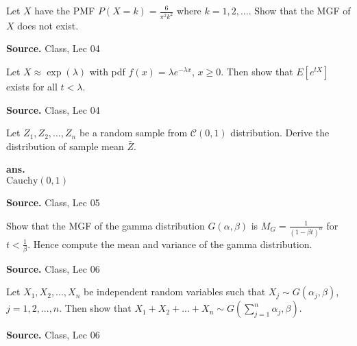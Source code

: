 \documentclass[12pt,twoside]{report}
\newenvironment*{ans}{\textbf{ans.}\space\em\\}{\par}
\newenvironment*{source}{\hfill\scriptsize\textbf{Source.}\space}{\par}
\begin{document}
\begin{samepage}
\begin{ex}
Let $X$ have the PMF $P(X = k) = \frac{6}{\pi ^2 k^2}$ where $k = 1,2, ...$.
Show that the MGF of $X$ does not exist.
\end{ex}
\begin{source}
Class, Lec 04
\end{source}
\end{samepage}

\begin{samepage}
\begin{ex}
Let $X \approx \exp(\lambda)$ with pdf $f(x) = \lambda e^{- \lambda x}$, $x \geq 0$. Then show that $E[e^{tX}]$ exists for all $t < \lambda$.
\end{ex}
\begin{source}
Class, Lec 04
\end{source}
\end{samepage}

\begin{samepage}
\begin{ex}
Let $Z_1, Z_2, ..., Z_n$ be a random sample from $\mathcal{C}(0,1)$ distribution. Derive the distribution of sample mean $\bar{Z}$.
\end{ex}
\begin{ans}
$\text{Cauchy}(0,1)$
\end{ans}
\begin{source}
Class, Lec 05
\end{source}
\end{samepage}

\begin{samepage}
\begin{ex}
Show that the MGF of the gamma distribution $G(\alpha, \beta)$ is $M_G = \displaystyle \frac{1}{(1 - \beta t)^\alpha}$ for $t < \displaystyle \frac{1}{\beta}$. Hence compute the mean and variance of the gamma distribution.
\end{ex}
\begin{source}
Class, Lec 06
\end{source}
\end{samepage}

\begin{samepage}
\begin{ex}
Let $X_1, X_2, ..., X_n$ be independent random variables such that  $X_j \sim G(\alpha_j, \beta)$, $j = 1, 2, ...,n$.
Then show that $X_1 +  X_2 + ... + X_n \sim G(\sum_{j=1}^n \alpha_j , \beta)$.
\end{ex}
\begin{source}
Class, Lec 06
\end{source}
\end{samepage}
\end{document}
